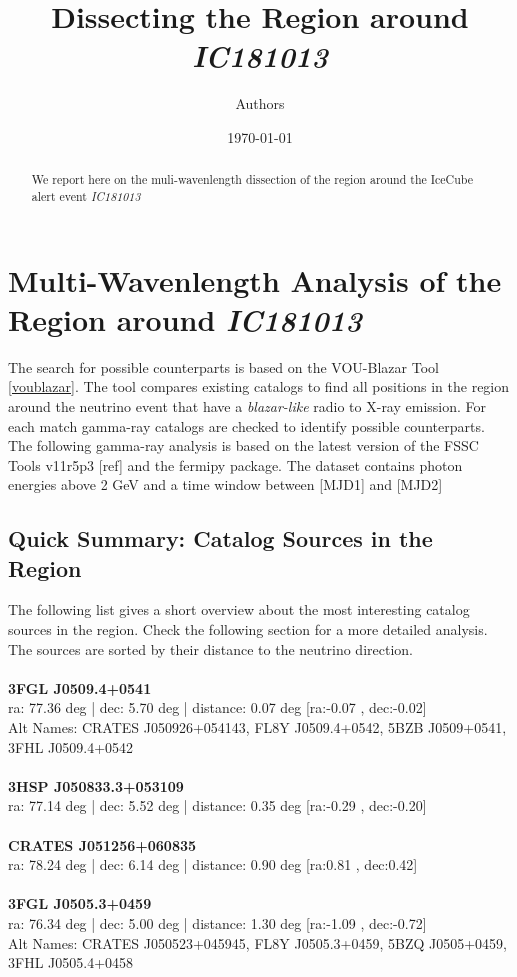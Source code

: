 \documentclass[a4paper]{article}
\title{Dissecting the Region around \textit{IC181013}}
\author{Authors}
\date{\today}
\begin{document}
\maketitle

\begin{abstract}
We report here on the muli-wavenlength dissection of the region around the IceCube alert event \textit{IC181013}
\end{abstract}

\section{Multi-Wavenlength Analysis of the Region around \textit{IC181013}}
The search for possible counterparts is based on the VOU-Blazar Tool \ref{voublazar}. The tool compares existing catalogs to find all positions in the region around the neutrino event that have a \textit{blazar-like} radio to X-ray emission. For each match gamma-ray catalogs are checked to identify possible counterparts. \\

The following gamma-ray analysis is based on the latest version of the FSSC Tools v11r5p3 [ref] and the fermipy package. The dataset contains photon energies above 2 GeV and a time window between [MJD1] and [MJD2]

\subsection{Quick Summary: Catalog Sources in the Region}
The following list gives a short overview about the most interesting catalog sources in the region. Check the following section for a more detailed analysis. The sources are sorted by their distance to the neutrino direction.
\\ \\
\textbf{3FGL J0509.4+0541} \\ 
 ra: 77.36 deg |  dec: 5.70 deg | distance: 0.07 deg [ra:-0.07 , dec:-0.02]\\ 
 Alt Names: CRATES J050926+054143, FL8Y J0509.4+0542, 5BZB J0509+0541, 3FHL J0509.4+0542\\ 
\\ 
\textbf{3HSP J050833.3+053109} \\ 
 ra: 77.14 deg |  dec: 5.52 deg | distance: 0.35 deg [ra:-0.29 , dec:-0.20]\\ 
\\ 
\textbf{CRATES J051256+060835} \\ 
 ra: 78.24 deg |  dec: 6.14 deg | distance: 0.90 deg [ra:0.81 , dec:0.42]\\ 
\\ 
\textbf{3FGL J0505.3+0459} \\ 
 ra: 76.34 deg |  dec: 5.00 deg | distance: 1.30 deg [ra:-1.09 , dec:-0.72]\\ 
 Alt Names: CRATES J050523+045945, FL8Y J0505.3+0459, 5BZQ J0505+0459, 3FHL J0505.4+0458\\ 
\\ 
\end{document}
